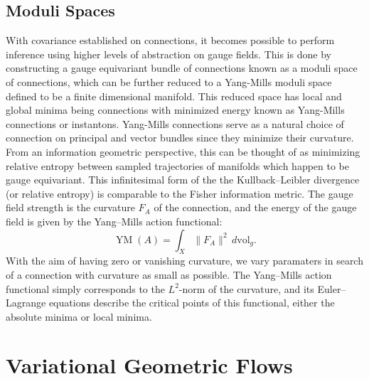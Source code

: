 \documentclass{article}
\begin{document}
\subsection{Moduli Spaces}
    With covariance established on connections, it becomes possible to perform inference using higher levels of abstraction on gauge fields. This is done by constructing a gauge equivariant bundle of connections known as a moduli space of connections, which can be further reduced to a Yang-Mills moduli space defined to be a finite dimensional manifold. This reduced space has local and global minima being connections with minimized energy known as Yang-Mills connections or instantons. Yang-Mills connections serve as a natural choice of connection on principal and vector bundles since they minimize their curvature. From an information geometric perspective, this can be thought of as minimizing relative entropy between sampled trajectories of manifolds which happen to be gauge equivariant. This infinitesimal form of the the Kullback–Leibler divergence (or relative entropy) is comparable to the Fisher information metric. The gauge field strength is the curvature $F_{A}$ of the connection, and the energy of the gauge field is given by the Yang–Mills action functional:
    \begin{equation}
         {\displaystyle \operatorname {YM} (A)=\int _{X}\|F_{A}\|^{2}\,d\mathrm {vol} _{g}.}
    \end{equation}
    With the aim of having zero or vanishing curvature, we vary paramaters in search of a connection with curvature as small as possible. The Yang–Mills action functional simply corresponds to the $L^{2}$-norm of the curvature, and its Euler–Lagrange equations describe the critical points of this functional, either the absolute minima or local minima.   

\section{Variational Geometric Flows}
\end{document}
